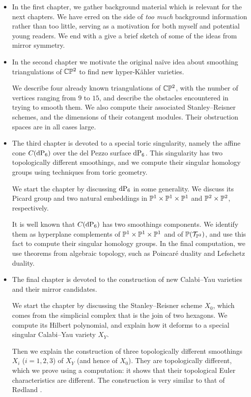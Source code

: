 \begin{itemize}
\item In the first chapter, we gather background material which is relevant for the next chapters. We have erred on the side of \emph{too much} background information rather than too little, serving as a motivation for both myself and potential young readers. We end with a give a brief sketch of some of the ideas from mirror symmetry.

\item In the second chapter we motivate the original naïve idea about smoothing triangulations of $\C \P^2$ to find new hyper-Kähler varieties.

We describe four already known triangulations of $\C \P^2$, with the number of vertices ranging from $9$ to $15$, and describe the obstacles encountered in trying to smooth them. We also compute their associated Stanley--Reisner schemes, and the dimensions of their cotangent modules. Their obstruction spaces are in all cases large.

\item The third chapter is devoted to a special toric singularity, namely the affine cone $C(\dP6)$ over the del Pezzo surface $\dP6$. This singularity has two topologically different smoothings, and we compute their singular homology groups using techniques from toric geometry.

We start the chapter by discussing $\dP6$ in some generality. We discuss its Picard group and two natural embeddings in $\P^1 \times \P^1 \times \P^1$ and $\P^2 \times \P^2$, respectively.

It is well known that $C(\dP6)$ has two smoothings components. We identify them as hyperplane complements of $\P^1 \times \P^1 \times \P^1$ and of $\P(\mathcal T_{\P^2})$, and use this fact to compute their singular homology groups. In the final computation, we use theorems from algebraic topology, such as Poincaré duality and Lefschetz duality. 

\item The final chapter is devoted to the construction of new Calabi--Yau varieties and their mirror candidates.

We start the chapter by discussing the Stanley--Reisner scheme $X_0$, which comes from the simplicial complex that is the join of two hexagons. We compute its Hilbert polynomial, and explain how it deforms to a special singular Calabi--Yau variety $X_Y$.

Then we explain the construction of three topologically different smoothings $X_i$ ($i=1,2,3$) of $X_Y$ (and hence of $X_0$). They are topologically different, which we prove using a \MM computation: it shows that their topological Euler characteristics are different. The construction is very similar to that of Rødland \cite{rodland_pfaffian}.


\end{itemize}
